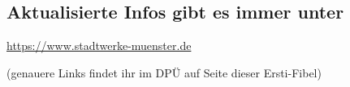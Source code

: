 \begin{multicols}{2}
\begin{center}
\subsection*{Aktualisierte Infos gibt es immer unter}
\url{https://www.stadtwerke-muenster.de}

(genauere Links findet ihr im DPÜ auf Seite \pageref{dpü} dieser Ersti-Fibel)
\end{center}

\end{multicols}
